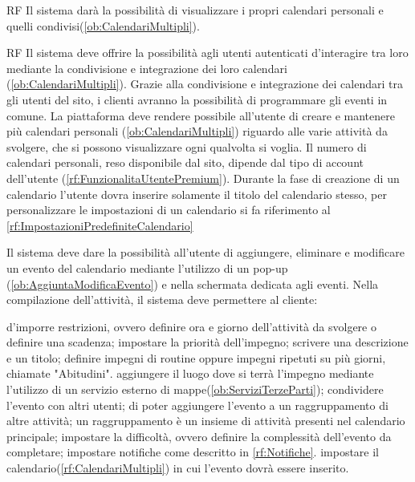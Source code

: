 \begin{listaPersonale}{RF}
 Il sistema darà la possibilità di visualizzare i propri calendari personali e quelli condivisi(\ref{ob:CalendariMultipli}).

	\begin{listaPersonale2}{RF}
		 Il sistema deve offrire la possibilità agli utenti autenticati d'interagire tra loro mediante la condivisione e integrazione dei loro calendari (\ref{ob:CalendariMultipli}). Grazie alla condivisione e integrazione dei calendari tra gli utenti del sito, i clienti avranno la possibilità di programmare gli eventi in comune.
 La piattaforma deve rendere possibile all'utente di creare e mantenere più calendari personali (\ref{ob:CalendariMultipli}) riguardo alle varie attività da svolgere, che si possono visualizzare ogni qualvolta si voglia. Il numero di calendari personali, reso disponibile dal sito, dipende dal tipo di account dell'utente (\ref{rf:FunzionalitaUtentePremium}). Durante la fase di creazione di un calendario l'utente dovra inserire solamente il titolo del calendario stesso, per personalizzare le impostazioni di un calendario si fa riferimento al \ref{rf:ImpostazioniPredefiniteCalendario}
	\end{listaPersonale2}

	 Il sistema deve dare la possibilità all'utente di aggiungere, eliminare e modificare un evento del calendario mediante l'utilizzo di un pop-up (\ref{ob:AggiuntaModificaEvento}) e nella schermata dedicata agli eventi. Nella compilazione dell'attività, il sistema deve permettere al cliente:
\begin{listaPersonale2}[RF]{}
 d'imporre restrizioni, ovvero definire ora e giorno dell'attività da svolgere o definire una scadenza;
		 impostare la priorità dell'impegno;
		 scrivere una descrizione e un titolo;
		 definire impegni di routine oppure impegni ripetuti su più giorni, chiamate "Abitudini".
 aggiungere il luogo dove si terrà l'impegno mediante l'utilizzo di un servizio esterno di mappe(\ref{ob:ServiziTerzeParti});
		 condividere l'evento con altri utenti;
 di poter aggiungere l'evento a un raggruppamento di altre attività; un raggruppamento è un insieme di attività presenti nel calendario principale;
		 impostare la difficoltà, ovvero definire la complessità dell'evento da completare;
		 impostare notifiche come descritto in \ref{rf:Notifiche}.
 impostare il calendario(\ref{rf:CalendariMultipli}) in cui l'evento dovrà essere inserito.
	\end{listaPersonale2}



\end{listaPersonale}
